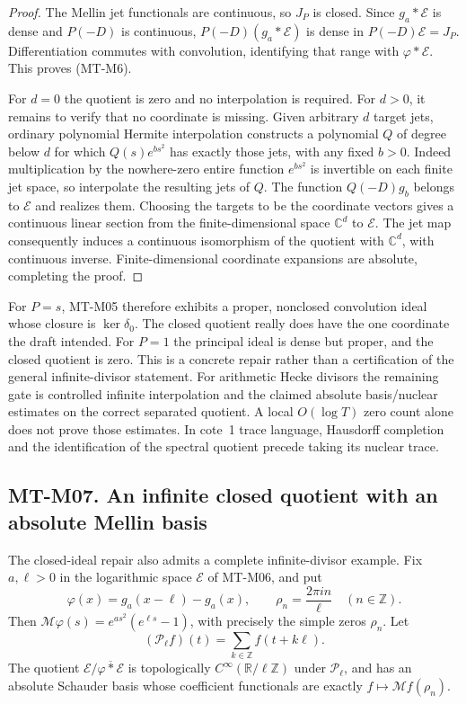 \documentclass[11pt,a4paper]{article}
\begin{document}
\begin{proof}
The Mellin jet functionals are continuous, so $J_P$ is closed.
Since $g_a*\mathcal E$ is dense and $P(-D)$ is continuous,
$P(-D)(g_a*\mathcal E)$ is dense in $P(-D)\mathcal E=J_P$.
Differentiation commutes with convolution, identifying that range
with $\varphi*\mathcal E$. This proves (MT-M6).

For $d=0$ the quotient is zero and no interpolation is required.
For $d>0$, it remains to verify that no coordinate is missing. Given arbitrary
$d$ target jets, ordinary polynomial Hermite interpolation constructs
a polynomial $Q$ of degree below $d$ for which
$Q(s)e^{bs^2}$ has exactly those jets, with any fixed $b>0$.
Indeed multiplication by the nowhere-zero entire function $e^{bs^2}$
is invertible on each finite jet space, so interpolate the resulting
jets of $Q$. The function $Q(-D)g_b$ belongs to $\mathcal E$ and
realizes them. Choosing the targets to be the coordinate vectors
gives a continuous linear section from the finite-dimensional space
$\mathbb C^d$ to $\mathcal E$. The jet map consequently induces
a continuous isomorphism of the quotient with $\mathbb C^d$,
with continuous inverse. Finite-dimensional coordinate expansions are
absolute, completing the proof.
\end{proof}

For $P=s$, MT-M05 therefore exhibits a proper, nonclosed convolution
ideal whose closure is $\ker\delta_0$. The closed quotient really
does have the one coordinate the draft intended. For $P=1$ the
principal ideal is dense but proper, and the closed quotient is zero.
This is a concrete repair rather than a certification of the general
infinite-divisor statement. For arithmetic Hecke divisors the remaining
gate is controlled infinite interpolation and the claimed absolute
basis/nuclear estimates on the correct separated quotient. A local
$O(\log T)$ zero count alone does not prove those estimates.
In cote~1 trace language, Hausdorff completion and the identification
of the spectral quotient precede taking its nuclear trace.

\subsection*{MT-M07. An infinite closed quotient with an absolute Mellin basis}
The closed-ideal repair also admits a complete infinite-divisor example.
Fix $a,\ell>0$ in the logarithmic space $\mathcal E$ of MT-M06, and put
\[
 \varphi(x)=g_a(x-\ell)-g_a(x),\qquad
 \rho_n=\frac{2\pi i n}{\ell}\quad(n\in\mathbb Z).
\]
Then $\mathcal M\varphi(s)=e^{as^2}(e^{\ell s}-1)$, with precisely
the simple zeros $\rho_n$. Let
\[
 (\mathcal P_\ell f)(t)=\sum_{k\in\mathbb Z}f(t+k\ell).
\]
The quotient $\mathcal E/\overline{\varphi*\mathcal E}$ is
topologically $C^\infty(\mathbb R/\ell\mathbb Z)$ under
$\mathcal P_\ell$, and has an absolute Schauder basis whose coefficient
functionals are exactly $f\mapsto\mathcal Mf(\rho_n)$.
\end{document}
